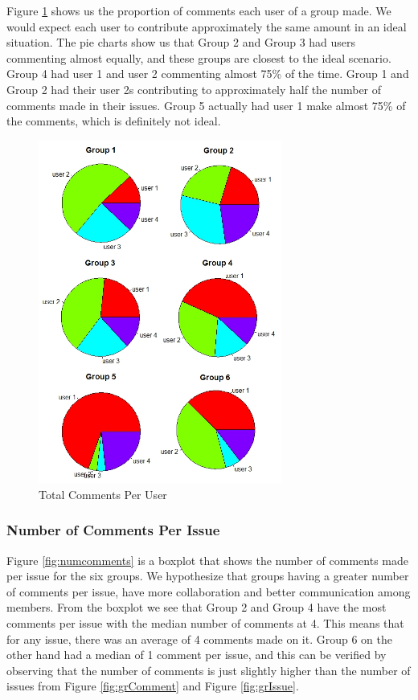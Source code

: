 \documentclass{acm_proc_article-sp}
\begin{document}
Figure \ref{fig:comments} shows us the proportion of comments each user of a group made. We would expect each user to contribute approximately the same amount in an ideal situation. The pie charts show us that Group 2 and Group 3 had users commenting almost equally, and these groups are closest to the ideal scenario. Group 4 had user 1 and user 2 commenting almost 75\% of the time. Group 1 and Group 2 had their user 2s contributing to approximately half the number of comments made in their issues. Group 5 actually had user 1 make almost 75\% of the comments, which is definitely not ideal.

\begin{figure}[h]
\centering
\includegraphics[width=8cm]{img/comment_user}
\caption{Total Comments Per User}
\label{fig:comments}
\end{figure}

\subsubsection{Number of Comments Per Issue}

Figure \ref{fig:numcomments} is a boxplot that shows the number of comments made per issue for the six groups. We hypothesize that groups having a greater number of comments per issue, have more collaboration and better communication among members. From the boxplot we see that Group 2 and Group 4 have the most comments per issue with the median number of comments at 4. This means that for any issue, there was an average of 4 comments made on it. Group 6 on the other hand had a median of 1 comment per issue, and this can be verified by observing that the number of comments is just slightly higher than the number of issues from Figure \ref{fig:grComment} and Figure \ref{fig:grIssue}.
\end{document}

